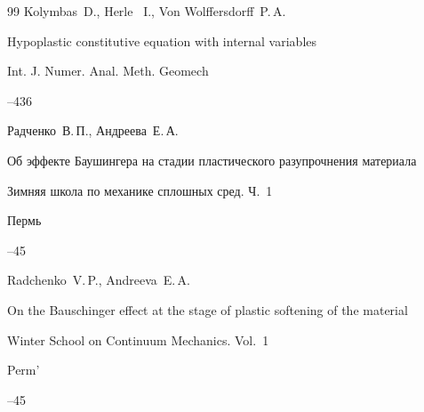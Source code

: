 \begin{thebibliography}{99}
\by     Kolymbas~D., Herle~ I., Von Wolffersdorff~P.\,A.

\paper Hypoplastic constitutive equation with internal variables

\jour Int. J. Numer. Anal. Meth. Geomech



–436




\by Радченко~В.\,П., Андреева~Е.\,А.

\paper Об эффекте Баушингера на стадии пластического разупрочнения материала

\inbook Зимняя школа по механике сплошных сред. {\rm Ч.~1}

\publaddr Пермь


--45

\misctransl

\by Radchenko~V.\,P., Andreeva~E.\,A.

\paper On the Bauschinger effect at the stage of plastic softening of the material

\inbook Winter School on Continuum Mechanics. {\rm Vol.~1}

\publaddr Perm'


--45



\end{thebibliography}



\noindent

\hskip6.5cm \thedate \par\noindent

\hskip6.5cm\therevdate



\vspace{-5mm}



\makeengtitle



\newpage



%

